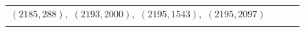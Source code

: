 \documentclass[11pt]{article}
\begin{document}
\begin{longtable}{@{}rrl>{\raggedright\arraybackslash}p{}@{}}
$(2185,288)$,\allowbreak\ $(2193,2000)$,\allowbreak\ $(2195,1543)$,\allowbreak\ $(2195,2097)$\\
\addlinespace[3pt]
\end{longtable}
\endgroup
\end{document}
